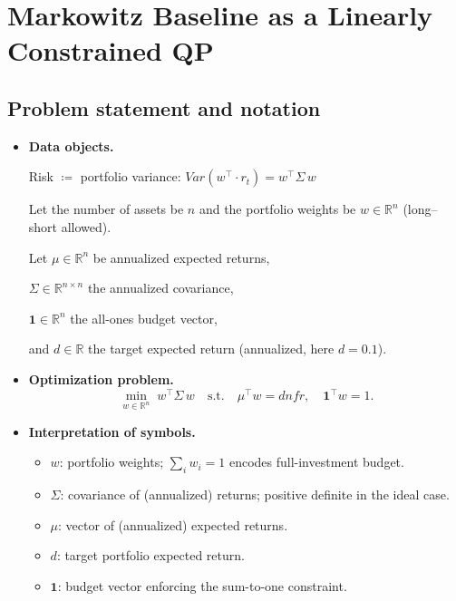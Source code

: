 \documentclass[11pt]{article}
\begin{document}
	\section{Markowitz Baseline as a Linearly Constrained QP}
	\subsection{Problem statement and notation}
	\begin{itemize}
		\item \textbf{Data objects.}
		
		Risk $\coloneq$ portfolio variance:  $Var(w^\top \cdot r_t) = w^\top \Sigma\, w$
		
		Let the number of assets be $n$ and the portfolio weights be $w\in\mathbb{R}^n$ (long--short allowed).
		
		Let $\mu\in\mathbb{R}^n$ be annualized expected returns,
		
		$\Sigma\in\mathbb{R}^{n\times n}$ the annualized covariance,
		
		$\mathbf{1}\in\mathbb{R}^n$ the all-ones budget vector,
		
		and $d\in\mathbb{R}$ the target expected return (annualized, here $d=0.1$).
		\item \textbf{Optimization problem.}
		\begin{equation}\label{eq:markowitz}
			\min_{w\in\mathbb{R}^n}\; w^\top \Sigma\, w
			\quad\text{s.t.}\quad
			\mu^\top w = dnfr,\quad \mathbf{1}^\top w = 1.
		\end{equation}
		\item \textbf{Interpretation of symbols.}
		\begin{itemize}
			\item $w$: portfolio weights; $\sum_i w_i=1$ encodes full-investment budget.
			\item $\Sigma$: covariance of (annualized) returns; positive definite in the ideal case.
			\item $\mu$: vector of (annualized) expected returns.
			\item $d$: target portfolio expected return.
			\item $\mathbf{1}$: budget vector enforcing the sum-to-one constraint.
		\end{itemize}
	\end{itemize}
	
\end{document}

